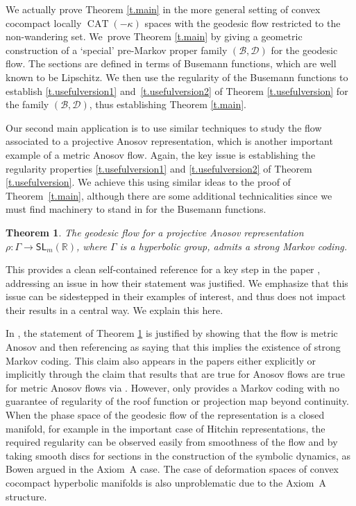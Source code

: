 \documentclass[10pt]{amsart}
\let\mathcal\mathscr
\newtheorem{thmx}{Theorem}
\theoremstyle{definition}
\numberwithin{equation}{section}
\DeclareMathOperator{\CAT}{CAT}
\newcommand\DDD{\mathcal D}
\newcommand\BBB{\mathcal B}
\begin{document}
We actually prove Theorem \ref{t.main} in the more general setting of convex cocompact locally $\CAT(-\kappa)$ spaces with the geodesic flow restricted to the non-wandering set. We~prove Theorem \ref{t.main} by giving a geometric construction of a `special' pre-Markov proper family $(\BBB, \DDD)$ for the geodesic flow. The sections are defined in terms of Busemann functions, which are well known to be Lipschitz. We then use the regularity of the Busemann functions to establish \eqref{t.usefulversion1} and~\eqref{t.usefulversion2} of Theorem \ref{t.usefulversion} for the family $(\BBB, \DDD)$, thus establishing Theorem \ref{t.main}.

Our second main application is to use similar techniques to study the flow associated to a projective Anosov representation, which is another important example of a metric Anosov flow. Again, the key issue is establishing the regularity properties \eqref{t.usefulversion1} and \eqref{t.usefulversion2} of Theorem \ref{t.usefulversion}. We achieve this using similar ideas to the proof of Theorem~\ref{t.main}, although there are some additional technicalities since we must find machinery to stand in for the Busemann functions.

\begin{thmx} \label{t.main2}
The geodesic flow for a projective Anosov representation $\rho: \Gamma \to \mathsf{SL}_m(\mathbb{R})$, where $\Gamma$ is a hyperbolic group, admits a strong Markov coding.
\end{thmx}

This provides a clean self-contained reference for a key step in the paper \cite{bcls}, addressing an issue in how their statement was justified. We emphasize that this issue can be sidestepped in their examples of interest, and thus does not impact their results in a central way. We explain this here.

In \cite{bcls}, the statement of Theorem \ref{t.main2} is justified by showing that the flow is metric Anosov \cite[Prop.\,5.1]{bcls} and then referencing \cite{pollicott} as saying that this implies the existence of strong Markov coding. This claim also appears in the papers \cite{BC17, BCLS18, PS17, aS16} either explicitly or implicitly through the claim that results that are true for Anosov flows are true for metric Anosov flows via \cite{pollicott}. However, \cite[Th.\,1]{pollicott} only provides a Markov coding with no guarantee of regularity of the roof function or projection map beyond continuity. When the phase space of the geodesic flow of the representation is a closed manifold, for example in the important case of Hitchin representations, the required regularity can be observed easily from smoothness of the flow and by taking smooth discs for sections in the construction of the symbolic dynamics, as Bowen argued in the Axiom~A case. The case of deformation spaces of convex cocompact hyperbolic manifolds is also unproblematic due to the Axiom~A structure.
\end{document}
